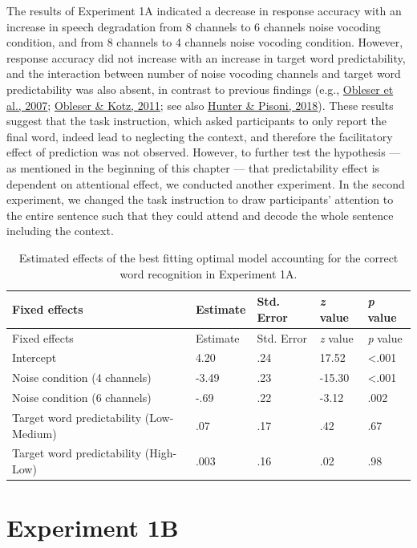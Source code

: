 \documentclass[a4paper, nobind]{templates/ociamthesis}
\begin{document}
The results of Experiment 1A indicated a decrease in response accuracy with an increase in speech degradation from 8 channels to 6 channels noise vocoding condition, and from 8 channels to 4 channels noise vocoding condition.
However, response accuracy did not increase with an increase in target word predictability,
and the interaction between number of noise vocoding channels and target word predictability was also absent, in contrast to previous findings (e.g., \protect\hyperlink{ref-Obleser2007}{Obleser et al., 2007}; \protect\hyperlink{ref-Obleser2011}{Obleser \& Kotz, 2011}; see also \protect\hyperlink{ref-Hunter2018}{Hunter \& Pisoni, 2018}).
These results suggest that the task instruction, which asked participants to only report the final word, indeed lead to neglecting the context, and therefore the facilitatory effect of prediction was not observed.
However, to further test the hypothesis --- as mentioned in the beginning of this chapter --- that predictability effect is dependent on attentional effect, we conducted another experiment.
In the second experiment, we changed the task instruction to draw participants' attention to the entire sentence such that they could attend and decode the whole sentence including the context.

\begin{longtable}[]{@{}lllll@{}}
\caption{Estimated effects of the best fitting optimal model accounting
for the correct word recognition in Experiment 1A.}
\label{results1a}
\tabularnewline
\toprule
Fixed effects & Estimate & Std. Error & \emph{z} value & \emph{p}
value \\
\midrule
\endfirsthead
\toprule
Fixed effects & Estimate & Std. Error & \emph{z} value & \emph{p}
value \\
\midrule
\endhead
Intercept & 4.20 & .24 & 17.52 & \textless.001 \\
Noise condition (4 channels) & -3.49 & .23 & -15.30 & \textless.001 \\
Noise condition (6 channels) & -.69 & .22 & -3.12 & .002 \\
Target word predictability (Low-Medium) & .07 & .17 & .42 & .67 \\
Target word predictability (High-Low) & .003 & .16 & .02 & .98 \\
\bottomrule
\end{longtable}

\hypertarget{experiment1b}{%
\section{Experiment 1B}\label{experiment1b}}
\end{document}
